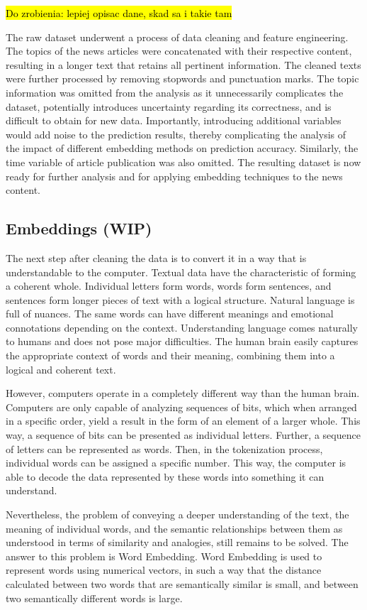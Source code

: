 \hl{Do zrobienia: lepiej opisac dane, skad sa i takie tam}

The raw dataset underwent a process of data cleaning and feature engineering. The topics of the news articles were concatenated with their respective content, resulting in a longer text that retains all pertinent information. The cleaned texts were further processed by removing stopwords and punctuation marks. The topic information was omitted from the analysis as it unnecessarily complicates the dataset, potentially introduces uncertainty regarding its correctness, and is difficult to obtain for new data. Importantly, introducing additional variables would add noise to the prediction results, thereby complicating the analysis of the impact of different embedding methods on prediction accuracy. Similarly, the time variable of article publication was also omitted. The resulting dataset is now ready for further analysis and for applying embedding techniques to the news content.


\subsection{Embeddings (WIP)}
The next step after cleaning the data is to convert it in a way that is understandable to the computer. Textual data have the characteristic of forming a coherent whole. Individual letters form words, words form sentences, and sentences form longer pieces of text with a logical structure. Natural language is full of nuances. The same words can have different meanings and emotional connotations depending on the context. Understanding language comes naturally to humans and does not pose major difficulties. The human brain easily captures the appropriate context of words and their meaning, combining them into a logical and coherent text.

However, computers operate in a completely different way than the human brain. Computers are only capable of analyzing sequences of bits, which when arranged in a specific order, yield a result in the form of an element of a larger whole. This way, a sequence of bits can be presented as individual letters. Further, a sequence of letters can be represented as words. Then, in the tokenization process, individual words can be assigned a specific number. This way, the computer is able to decode the data represented by these words into something it can understand.

Nevertheless, the problem of conveying a deeper understanding of the text, the meaning of individual words, and the semantic relationships between them as understood in terms of similarity and analogies, still remains to be solved. The answer to this problem is Word Embedding. Word Embedding is used to represent words using numerical vectors, in such a way that the distance calculated between two words that are semantically similar is small, and between two semantically different words is large.

